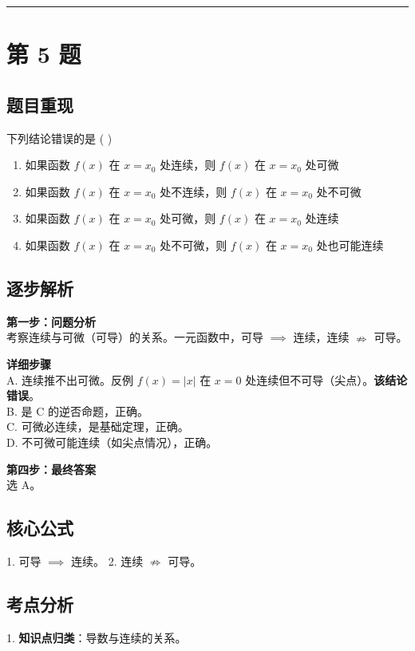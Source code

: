 \documentclass[10pt, a4paper]{ctexart}
\newcommand{\problemheader}{
    \vspace{0.5cm}
    \noindent\rule[0.5ex]{\linewidth}{2pt} %
}
\newcommand{\analysisheader}{
    \vspace{0.2cm}
    \noindent{\color{red}\rule[0.5ex]{\linewidth}{0.5pt}} %
    \vspace{0.1cm}
}
\begin{document}
\problemheader
\section*{第 5 题}
\subsection*{题目重现}
下列结论错误的是 ( \quad ) \\
\begin{enumerate}[label=\Alph{enumii}., leftmargin=2em]
    \item 如果函数 $f(x)$ 在 $x=x_0$ 处连续，则 $f(x)$ 在 $x=x_0$ 处可微
    \item 如果函数 $f(x)$ 在 $x=x_0$ 处不连续，则 $f(x)$ 在 $x=x_0$ 处不可微
    \item 如果函数 $f(x)$ 在 $x=x_0$ 处可微，则 $f(x)$ 在 $x=x_0$ 处连续
    \item 如果函数 $f(x)$ 在 $x=x_0$ 处不可微，则 $f(x)$ 在 $x=x_0$ 处也可能连续
\end{enumerate}

\analysisheader
{\color{red}
\subsection*{逐步解析}
\textbf{第一步：问题分析} \\
考察连续与可微（可导）的关系。一元函数中，可导 $\implies$ 连续，连续 $\nRightarrow$ 可导。

\textbf{详细步骤} \\
A. 连续推不出可微。反例 $f(x) = |x|$ 在 $x=0$ 处连续但不可导（尖点）。\textbf{该结论错误}。 \\
B. 是 C 的逆否命题，正确。 \\
C. 可微必连续，是基础定理，正确。 \\
D. 不可微可能连续（如尖点情况），正确。

\textbf{第四步：最终答案} \\
选 A。

\subsection*{核心公式}
1. 可导 $\implies$ 连续。
2. 连续 $\nRightarrow$ 可导。

\subsection*{考点分析}
1. \textbf{知识点归类}：导数与连续的关系。
}
\end{document}
